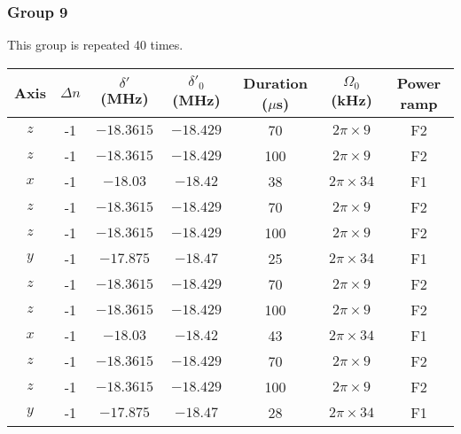 \documentclass[aps,secnumarabic,amsmath,amssymb]{revtex4}
\begin{document}
\subsubsection{Group 9}
This group is repeated 40 times.
\begin{center}
  \begin{tabular}{|c|c|c|c|c|c|c|}
    \hline
    Axis&$\Delta n$&$\delta'$ (MHz)&$\delta'_0$ (MHz)&Duration ($\mu$s)& $\Omega_0$ (kHz)&Power ramp\\\hline
    $z$&-1&$-18.3615$&$-18.429$&70&$2\pi\times9$&F2\\\hline
    $z$&-1&$-18.3615$&$-18.429$&100&$2\pi\times9$&F2\\\hline
    $x$&-1&$-18.03$&$-18.42$&38&$2\pi\times34$&F1\\\hline
    $z$&-1&$-18.3615$&$-18.429$&70&$2\pi\times9$&F2\\\hline
    $z$&-1&$-18.3615$&$-18.429$&100&$2\pi\times9$&F2\\\hline
    $y$&-1&$-17.875$&$-18.47$&25&$2\pi\times34$&F1\\\hline
    $z$&-1&$-18.3615$&$-18.429$&70&$2\pi\times9$&F2\\\hline
    $z$&-1&$-18.3615$&$-18.429$&100&$2\pi\times9$&F2\\\hline
    $x$&-1&$-18.03$&$-18.42$&43&$2\pi\times34$&F1\\\hline
    $z$&-1&$-18.3615$&$-18.429$&70&$2\pi\times9$&F2\\\hline
    $z$&-1&$-18.3615$&$-18.429$&100&$2\pi\times9$&F2\\\hline
    $y$&-1&$-17.875$&$-18.47$&28&$2\pi\times34$&F1\\\hline
  \end{tabular}
\end{center}


\end{document}
